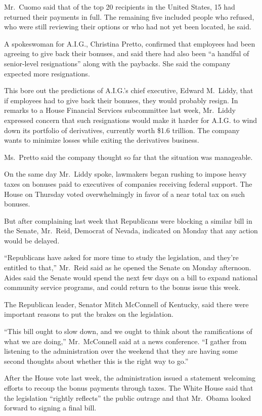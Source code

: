 \documentclass[12pt,a4paper,onecolumn]{article}
\begin{document}
\begin{CJK*}{GBK}{song}
Mr.~Cuomo said that of the top 20 recipients in the United States, 15 had returned their payments in
full. The remaining five included people who refused, who were still reviewing their options or who
had not yet been located, he said.

A spokeswoman for A.I.G., Christina Pretto, confirmed that employees had been agreeing to give back
their bonuses, and said there had also been ``a handful of senior-level resignations'' along with
the paybacks. She said the company expected more resignations.

This bore out the predictions of A.I.G.'s chief executive, Edward M.~Liddy, that if employees had to
give back their bonuses, they would probably resign. In remarks to a House Financial Services
subcommittee last week, Mr.~Liddy expressed concern that such resignations would make it harder for
A.I.G. to wind down its portfolio of derivatives, currently worth \$1.6 trillion. The company wants
to minimize losses while exiting the derivatives business.

Ms.~Pretto said the company thought so far that the situation was manageable.

On the same day Mr.~Liddy spoke, lawmakers began rushing to impose heavy taxes on bonuses paid to
executives of companies receiving federal support. The House on Thursday voted overwhelmingly in
favor of a near total tax on such bonuses.

But after complaining last week that Republicans were blocking a similar bill in the Senate,
Mr.~Reid, Democrat of Nevada, indicated on Monday that any action would be delayed.

``Republicans have asked for more time to study the legislation, and they're entitled to that,''
Mr.~Reid said as he opened the Senate on Monday afternoon. Aides said the Senate would spend the
next few days on a bill to expand national community service programs, and could return to the bonus
issue this week.

The Republican leader, Senator Mitch McConnell of Kentucky, said there were important reasons to put
the brakes on the legislation.

``This bill ought to slow down, and we ought to think about the ramifications of what we are
doing,'' Mr.~McConnell said at a news conference. ``I gather from listening to the administration
over the weekend that they are having some second thoughts about whether this is the right way to
go.''

After the House vote last week, the administration issued a statement welcoming efforts to recoup
the bonus payments through taxes. The White House said that the legislation ``rightly reflects'' the
public outrage and that Mr.~Obama looked forward to signing a final bill.


\end{CJK*}
\end{document}
